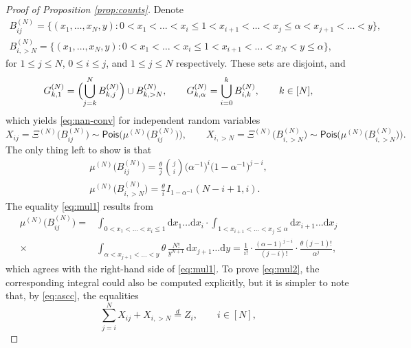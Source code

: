 \documentclass[11pt]{article}
\newcommand{\dd}{\mathrm d}
\newcommand{\hs}{\hspace{1pt}}
\newcommand{\1}[1][]{
	\ifx&#1&\mathds{1}
	\else\mathds{1}\left\{#1\right\}\fi}
\newcommand{\deq}{\overset{d}{=}}
\theoremstyle{definition}
\theoremstyle{remark}
\numberwithin{equation}{section}
\begin{document}
\begin{proof}[Proof of Proposition \ref{prop:counts}]
		Denote
		\begin{gather*}
			B_{ij}^{(N)} = \bigl\{(x_1,\ldots,x_N,y): 
			0 < x_1 < \ldots < x_i \le 1 < x_{i+1} < \ldots < x_j \le \alpha < x_{j+1} < \ldots < y \bigr\},\\
			B_{i,>N}^{(N)} = \bigl\{(x_1,\ldots,x_N,y): 
			0 < x_1 < \ldots < x_i \le 1 < x_{i+1} < \ldots < x_N < y \le \alpha \bigr\},
		\end{gather*}
		for $1 \le j \le N$, $0 \le i \le j$, and $1 \le j \le N$ respectively. These sets are disjoint, and
		\begin{equation*}
				G_{k,1}^{(N)} = \Bigl(\bigcup_{j=k}^N B_{k,j}^{(N)}\Bigr) \cup B_{k,>N}^{(N)}, \qquad
				G_{k,\alpha}^{(N)} = \bigcup_{i=0}^k B_{i,k}^{(N)}, \qquad k \in [N],
			\end{equation*}
		which yields \eqref{eq:nan-conv} for independent random variables
		\begin{equation*}
			X_{ij} = \Xi^{(N)}\bigl(B_{ij}^{(N)}\bigr) \sim \mathsf{Pois} \bigl(\mu^{(N)}\bigl(B_{ij}^{(N)}\bigr)\bigr),\qquad
			X_{i,>N} = \Xi^{(N)}\bigl(B_{i,>N}^{(N)}\bigr) \sim \mathsf{Pois} \bigl(\mu^{(N)}\bigl(B_{i,>N}^{(N)}\bigr)\bigr).
		\end{equation*}
		The only thing left to show is that
		\begin{gather}
			\label{eq:mul1}
			\mu^{(N)}\bigl(B_{ij}^{(N)}\bigr) = 
			\frac{\theta}{j} \hs \binom{j}{i} \bigl(\alpha^{-1}\bigr)^i \bigl(1-\alpha^{-1}\bigr)^{j-i},\\
			\mu^{(N)}\bigl(B_{i,>N}^{(N)}\bigr) = \frac{\theta}{i}\hs I_{1-\alpha^{-1}}(N-i+1,i).
			\label{eq:mul2}
		\end{gather}
		The equality \eqref{eq:mul1} results from
		\begin{align*}
			\mu^{(N)}\bigl(B_{ij}^{(N)}\bigr)
			=&\int_{0 < x_1 < \ldots < x_i \le 1}\!\!\!\!\dd x_1\ldots\dd x_i \cdot
			\int_{1 < x_{i+1} < \ldots < x_j \le \alpha}\!\!\!\! \dd x_{i+1}\ldots \dd x_j\\\times 
			&\int_{\alpha < x_{j+1} < \ldots < y}\!\!\!\! \theta\,\frac{N!}{y^{N+1}}\,\dd x_{j+1}\ldots\dd y
			=\frac{1}{i!} \cdot \frac{(\alpha-1)^{j-i}}{(j-i)!} \cdot \frac{\theta\hs(j-1)!}{\alpha^j},
		\end{align*}
		which agrees with the right-hand side of \eqref{eq:mul1}. To prove \eqref{eq:mul2},
		the corresponding integral could also be computed explicitly, but it is simpler to note that, by \eqref{eq:ascc}, the equalities
		\begin{equation*}
			\sum_{j=i}^N X_{ij} + X_{i,>N} \deq Z_i,\qquad i\in[N],

\end{equation*}
\end{proof}
\end{document}
